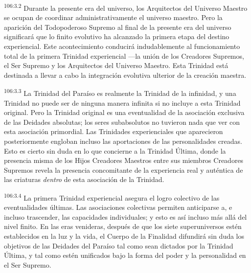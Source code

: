 \documentclass[twoside, 11pt]{book}
\begin{document}
\par
\textsuperscript{106:3.2} Durante la presente era del universo, los Arquitectos del Universo Maestro se ocupan de coordinar administrativamente el universo maestro. Pero la aparición del Todopoderoso Supremo al final de la presente era del universo significará que lo finito evolutivo ha alcanzado la primera etapa del destino experiencial. Este acontecimiento conducirá indudablemente al funcionamiento total de la primera Trinidad experiencial ---la unión de los Creadores Supremos, el Ser Supremo y los Arquitectos del Universo Maestro. Esta Trinidad está destinada a llevar a cabo la integración evolutiva ulterior de la creación maestra.

\par
\textsuperscript{106:3.3} La Trinidad del Paraíso es realmente la Trinidad de la infinidad, y una Trinidad no puede ser de ninguna manera infinita si no incluye a esta Trinidad original. Pero la Trinidad original es una eventualidad de la asociación exclusiva de las Deidades absolutas; los seres subabsolutos no tuvieron nada que ver con esta asociación primordial. Las Trinidades experienciales que aparecieron posteriormente engloban incluso las aportaciones de las personalidades creadas. Esto es cierto sin duda en lo que concierne a la Trinidad Última, donde la presencia misma de los Hijos Creadores Maestros entre sus miembros Creadores Supremos revela la presencia concomitante de la experiencia real y auténtica de las criaturas \textit{dentro} de esta asociación de la Trinidad.

\par
\textsuperscript{106:3.4} La primera Trinidad experiencial asegura el logro colectivo de las eventualidades últimas. Las asociaciones colectivas permiten anticiparse a, e incluso trascender, las capacidades individuales; y esto es así incluso más allá del nivel finito. En las eras venideras, después de que los siete superuniversos estén establecidos en la luz y la vida, el Cuerpo de la Finalidad difundirá sin duda los objetivos de las Deidades del Paraíso tal como sean dictados por la Trinidad Última, y tal como estén unificados bajo la forma del poder y la personalidad en el Ser Supremo.
\end{document}
